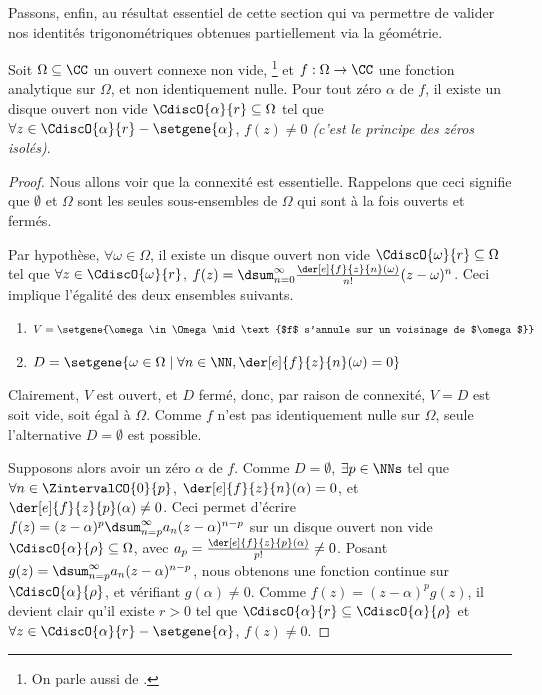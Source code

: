 

Passons, enfin, au résultat essentiel de cette section qui va permettre de valider nos identités trigonométriques obtenues partiellement via la géométrie.


\begin{fact} \label{isolated-zero}
    Soit $\Omega \subseteq \CC$ un ouvert connexe non vide,%
    \footnote{
    	On parle aussi de .
    }
    et
    $f: \Omega \rightarrow \CC$ une fonction analytique sur $\Omega$, et non identiquement nulle.
	Pour tout zéro $\alpha$ de $f$, il existe un disque ouvert non vide $\CdiscO{\alpha}{r} \subseteq \Omega$ tel que 
	$\forall z \in \CdiscO{\alpha}{r} - \setgene{\alpha}$, $f(z) \neq 0$
	\emph{(c'est le principe des zéros isolés)}.  
\end{fact}


\begin{proof}
	Nous allons voir que la connexité est essentielle. Rappelons que ceci signifie que $\emptyset$ et $\Omega$ sont les seules sous-ensembles de $\Omega$ qui sont à la fois ouverts et fermés.
	
	\smallskip
	
	Par hypothèse, 
	$\forall \omega \in \Omega$, il existe un disque ouvert non vide $\CdiscO{\omega}{r} \subseteq \Omega$ tel que 
	$\forall z \in \CdiscO{\omega}{r}$, 
	$f(z) = \dsum_{n = 0}^{\infty} \frac{\der[e]{f}{z}{n}(\omega)}{n!} (z - \omega)^n$.
	Ceci implique l'égalité des deux ensembles suivants.
	\begin{enumerate}
		\item $V = \setgene{\omega \in \Omega \mid \text{$f$ s'annule sur un voisinage de $\omega$}}$

		\item $D = \setgene{\omega \in \Omega \mid \forall n \in \NN, \der[e]{f}{z}{n}(\omega) = 0}$
	\end{enumerate}
		
	Clairement,
	$V$ est ouvert, et $D$ fermé, donc, par raison de connexité, $V = D$ est soit vide, soit égal à $\Omega$.
	Comme $f$ n'est pas identiquement nulle sur $\Omega$, seule l'alternative $D = \emptyset$ est possible.

	\smallskip
	
	Supposons alors avoir un zéro $\alpha$ de $f$. 
	Comme $D = \emptyset$, $\exists p \in \NNs$ tel que 
	$\forall n \in \ZintervalCO{0}{p}$, $\der[e]{f}{z}{n}(\alpha) = 0$,
	et
	$\der[e]{f}{z}{p}(\alpha) \neq 0$.
	Ceci permet d'écrire
	$f(z) = (z - \alpha)^p \dsum_{n = p}^{\infty} a_n (z - \alpha)^{n - p}$
	sur un disque ouvert non vide $\CdiscO{\alpha}{\rho} \subseteq \Omega$,
	avec $a_p = \frac{\der[e]{f}{z}{p}(\alpha)}{p!} \neq 0$.
	Posant $g(z) = \dsum_{n = p}^{\infty} a_n (z - \alpha)^{n - p}$, nous obtenons une fonction continue sur $\CdiscO{\alpha}{\rho}$, et vérifiant $g(\alpha) \neq 0$.
	Comme $f(z) = (z - \alpha)^p g(z)$, il devient clair qu'il existe $r > 0$ tel que
	$\CdiscO{\alpha}{r} \subseteq \CdiscO{\alpha}{\rho}$
	et
	$\forall z \in \CdiscO{\alpha}{r} - \setgene{\alpha}$, $f(z) \neq 0$.
\end{proof}


